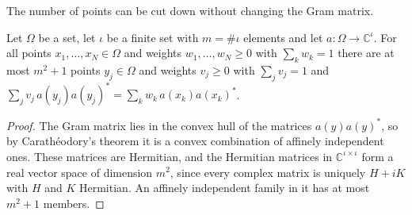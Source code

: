 The number of points can be cut down without changing the Gram matrix.

\begin{lemma}
\label{lem:few-design-points}
\leanok
Let $\Omega$ be a set, let $\iota$ be a finite set with $m = \#\iota$ elements and let
$a : \Omega \to \mathbb{C}^{\iota}$. For all points $x_1, \dots, x_N \in \Omega$ and weights
$w_1, \dots, w_N \geq 0$ with $\sum_k w_k = 1$ there are at most $m^2 + 1$ points
$y_j \in \Omega$ and weights $v_j \geq 0$ with $\sum_j v_j = 1$ and
$\sum_j v_j \, a(y_j) a(y_j)^* = \sum_k w_k \, a(x_k) a(x_k)^*$.
\end{lemma}

\begin{proof}
\leanok
The Gram matrix lies in the convex hull of the matrices $a(y) a(y)^*$, so by
Carath\'eodory's theorem it is a convex combination of affinely independent ones. These
matrices are Hermitian, and the Hermitian matrices in $\mathbb{C}^{\iota \times \iota}$ form
a real vector space of dimension $m^2$, since every complex matrix is uniquely $H + iK$
with $H$ and $K$ Hermitian. An affinely independent family in it has at most $m^2 + 1$
members.
\end{proof}

